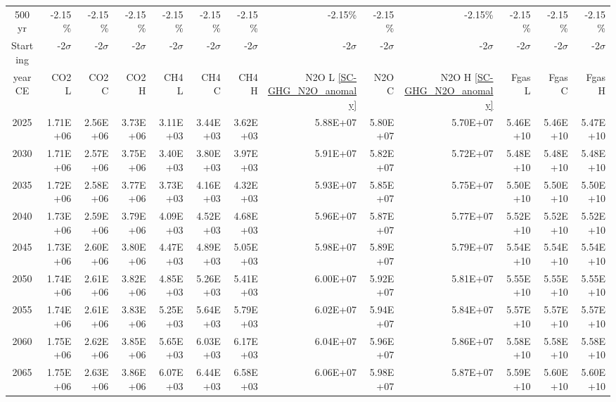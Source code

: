 \documentclass{article}
\begin{document}
\begin{table}
\begin{tabular}{crrr|rrr|rrr|rrr}
         &            &            &            &            &            &            &            &            &            &            &            &            \\ \hline
500 yr   & -2.15\%    & -2.15\%    & -2.15\%    & -2.15\%    & -2.15\%    & -2.15\%    & -2.15\%    & -2.15\%    & -2.15\%    & -2.15\%    & -2.15\%    & -2.15\%    \\
Starting & -2$\sigma$ & -2$\sigma$ & -2$\sigma$ & -2$\sigma$ & -2$\sigma$ & -2$\sigma$ & -2$\sigma$ & -2$\sigma$ & -2$\sigma$ & -2$\sigma$ & -2$\sigma$ & -2$\sigma$ \\
year CE  & CO2 L      & CO2 C      & CO2 H      & CH4 L      & CH4 C      & CH4 H      & N2O L \ref{SC-GHG_N2O_anomaly}     & N2O C      & N2O H \ref{SC-GHG_N2O_anomaly}      & Fgas L     & Fgas C     & Fgas H     \\
2025     & 1.71E+06   & 2.56E+06   & 3.73E+06   & 3.11E+03   & 3.44E+03   & 3.62E+03   & 5.88E+07   & 5.80E+07   & 5.70E+07   & 5.46E+10   & 5.46E+10   & 5.47E+10   \\
2030     & 1.71E+06   & 2.57E+06   & 3.75E+06   & 3.40E+03   & 3.80E+03   & 3.97E+03   & 5.91E+07   & 5.82E+07   & 5.72E+07   & 5.48E+10   & 5.48E+10   & 5.48E+10   \\
2035     & 1.72E+06   & 2.58E+06   & 3.77E+06   & 3.73E+03   & 4.16E+03   & 4.32E+03   & 5.93E+07   & 5.85E+07   & 5.75E+07   & 5.50E+10   & 5.50E+10   & 5.50E+10   \\
2040     & 1.73E+06   & 2.59E+06   & 3.79E+06   & 4.09E+03   & 4.52E+03   & 4.68E+03   & 5.96E+07   & 5.87E+07   & 5.77E+07   & 5.52E+10   & 5.52E+10   & 5.52E+10   \\
2045     & 1.73E+06   & 2.60E+06   & 3.80E+06   & 4.47E+03   & 4.89E+03   & 5.05E+03   & 5.98E+07   & 5.89E+07   & 5.79E+07   & 5.54E+10   & 5.54E+10   & 5.54E+10   \\
2050     & 1.74E+06   & 2.61E+06   & 3.82E+06   & 4.85E+03   & 5.26E+03   & 5.41E+03   & 6.00E+07   & 5.92E+07   & 5.81E+07   & 5.55E+10   & 5.55E+10   & 5.55E+10   \\
2055     & 1.74E+06   & 2.61E+06   & 3.83E+06   & 5.25E+03   & 5.64E+03   & 5.79E+03   & 6.02E+07   & 5.94E+07   & 5.84E+07   & 5.57E+10   & 5.57E+10   & 5.57E+10   \\
2060     & 1.75E+06   & 2.62E+06   & 3.85E+06   & 5.65E+03   & 6.03E+03   & 6.17E+03   & 6.04E+07   & 5.96E+07   & 5.86E+07   & 5.58E+10   & 5.58E+10   & 5.58E+10   \\
2065     & 1.75E+06   & 2.63E+06   & 3.86E+06   & 6.07E+03   & 6.44E+03   & 6.58E+03   & 6.06E+07   & 5.98E+07   & 5.87E+07   & 5.59E+10   & 5.60E+10   & 5.60E+10   \\

\end{tabular}
\end{table}
\end{document}

